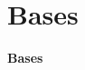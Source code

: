 \documentclass[aspectratio=169]{beamer}
\newcommand{\SectionTransitionFrame}[1]{%
  \begin{frame}[plain]
    \centering
    \vfill
    {\Huge\bfseries #1\par}
    \vfill
  \end{frame}
}
\begin{document}



\section{Bases}

\SectionTransitionFrame{Bases}
\end{document}

